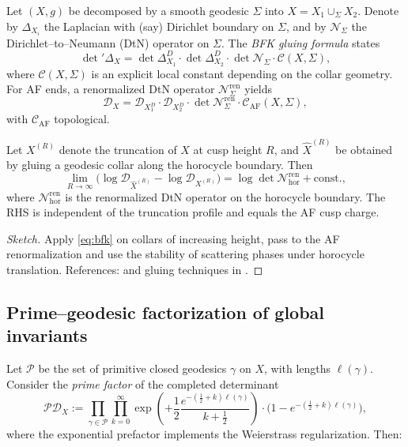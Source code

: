 Let $(X,g)$ be decomposed by a smooth geodesic $\Sigma$ into $X=X_1\cup_\Sigma X_2$. Denote by $\Delta_{X_i}$ the Laplacian with (say) Dirichlet boundary on $\Sigma$, and by $\mathcal{N}_\Sigma$ the Dirichlet–to–Neumann (DtN) operator on $\Sigma$. The \emph{BFK gluing formula} states
\begin{equation}\label{eq:bfk}
\det{}'\!\Delta_X
= \det\Delta_{X_1}^{D}\cdot\det\Delta_{X_2}^{D}\cdot \det\mathcal{N}_\Sigma \cdot \mathcal{C}(X,\Sigma),
\end{equation}
where $\mathcal{C}(X,\Sigma)$ is an explicit local constant depending on the collar geometry. For AF ends, a renormalized DtN operator $\mathcal{N}_\Sigma^{\mathrm{ren}}$ yields
\begin{equation}\label{eq:bfk-af}
\mathscr{D}_X
= \mathscr{D}_{X_1^D}\cdot \mathscr{D}_{X_2^D}\cdot \det\mathcal{N}_\Sigma^{\mathrm{ren}}\cdot \mathcal{C}_{\mathrm{AF}}(X,\Sigma),
\end{equation}
with $\mathcal{C}_{\mathrm{AF}}$ topological. %

\begin{theorem}
\label{thm:cusp-surgery}
Let $X^{(R)}$ denote the truncation of $X$ at cusp height $R$, and $\widehat{X}^{(R)}$ be obtained by gluing a geodesic collar along the horocycle boundary. Then
\[
\lim_{R\to\infty}\Big(
\log\mathscr{D}_{\widehat{X}^{(R)}}-\log\mathscr{D}_{X^{(R)}}
\Big)
= \log \det \mathcal{N}^{\mathrm{ren}}_{\mathrm{hor}}
+ \mathrm{const.},
\]
where $\mathcal{N}^{\mathrm{ren}}_{\mathrm{hor}}$ is the renormalized DtN operator on the horocycle boundary. The RHS is independent of the truncation profile and equals the AF cusp charge. %
\end{theorem}

\begin{proof}[Sketch]
Apply \eqref{eq:bfk} on collars of increasing height, pass to the AF renormalization and use the stability of scattering phases under horocycle translation. References: \cite{Borthwick} and gluing techniques in \cite{Osgood1988}. %
\end{proof}

\subsection{Prime–geodesic factorization of global invariants}
\label{subsec:prime-factor}
\relax\hspace{0pt}

Let $\mathcal{P}$ be the set of primitive closed geodesics $\gamma$ on $X$, with lengths $\ell(\gamma)$. Consider the \emph{prime factor} of the completed determinant
\begin{equation}\label{eq:prime-factor}
\mathcal{P}\mathscr{D}_X
:= \prod_{\gamma\in\mathcal{P}}\prod_{k=0}^{\infty}
\exp\!\left(+\frac{1}{2}\frac{e^{-(\frac12+k)\ell(\gamma)}}{k+ \tfrac12}\right)
\cdot \Big(1-e^{-(\frac12+k)\ell(\gamma)}\Big),
\end{equation}
where the exponential prefactor implements the Weierstrass regularization. Then:

